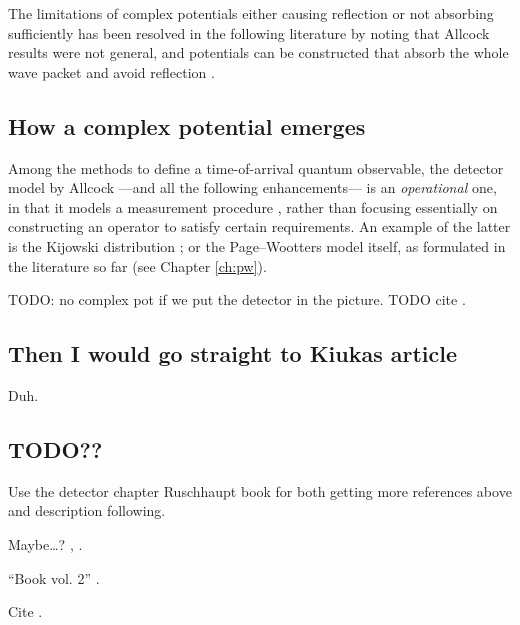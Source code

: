 The limitations of complex potentials either causing reflection
or not absorbing sufficiently has been resolved
in the following literature
by noting that Allcock results were not general, and
potentials can be constructed that absorb the whole wave packet
and avoid reflection \parencite{Muga_TOAQM, Muga_CompositeAbsPot, ComplexAbsPot}.

\subsection{How a complex potential emerges}

Among the methods to define a time-of-arrival quantum observable,
the detector model by Allcock ---and all the following enhancements--- is an
\emph{operational} one,
in that it models a measurement procedure \parencite[\S 9]{Leavens_TOA},
rather than focusing essentially on constructing an operator to satisfy certain requirements.
An example of the latter is the Kijowski distribution \parencite[\S 8]{Leavens_TOA};
or the Page--Wootters model itself, as formulated in the literature so far (see Chapter \ref{ch:pw}).

TODO: no complex pot if we put the detector in the picture.
TODO cite \cite{Damborenea, Damborenea_atomic}.

\subsection{Then I would go straight to Kiukas article}

Duh.

\subsection*{TODO??}

Use the detector chapter Ruschhaupt book for both getting more references above and description following.

Maybe\dots? \cite{ProbCurrent}, \cite{Ruschhaupt_QMoT}.

``Book vol. 2'' \cite{TQM2:Detector}.

Cite \cite{Muga_ArrTimeOpNormal, Sudarshan_Zeno, Echanobe, Savvidou-1, Savvidou-2}.


